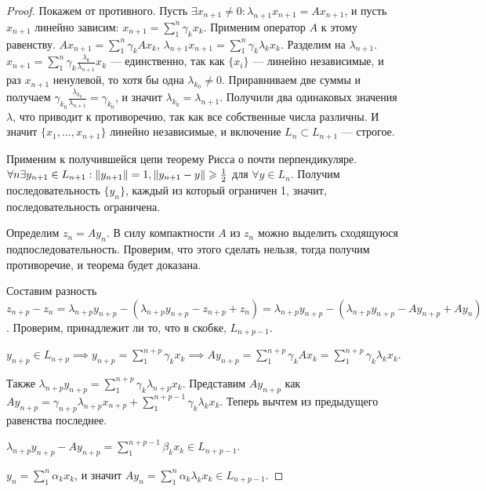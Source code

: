 \documentclass{article}
\begin{document}
\begin{proof}
    Покажем от противного. Пусть $\exists x_{n+1} \neq 0: \lambda_{n+1}x_{n+1} = A x_{n+1}$, и пусть $x_{n+1}$ линейно зависим: $x_{n+1} = \sum_{1}^{n}\gamma_k x_k$. Применим оператор $A$ к этому равенству. $A x_{n+1} = \sum_{1}^{n}\gamma_k A x_k$, $\lambda_{n+1} x_{n+1} = \sum_{1}^{n}\gamma_k \lambda_k x_k$. Разделим на $\lambda_{n+1}$. $x_{n+1} = \sum_{1}^{n}\gamma_k \frac{\lambda_k}{\lambda_{n+1}} x_k$ --- единственно, так как $\{x_{i}\}$ --- линейно независимые, и раз $x_{n+1}$ ненулевой, то хотя бы одна $\lambda_{k_{0}} \neq 0$. Приравниваем две суммы и получаем $\gamma_{k_{0}} \frac{\lambda_{k_{0}}}{\lambda_{n+1}} = \gamma_{k_{0}}$, и значит $\lambda_{k_{0}} = \lambda_{n+1}$. Получили два одинаковых значения $\lambda$, что приводит к противоречию, так как все собственные числа различны. И значит $\{x_{1}, \dotso, x_{n+1}\}$ линейно независимые, и включение $L_{n} \subset L_{n+1}$ --- строгое. \hfill \break

    Применим к получившейся цепи теорему Рисса о почти перпендикуляре. $\forall n \exists y_{n+1} \in L_{n+1}: \left\|y_{n+1}\right\| = 1, \left\|y_{n+1} - y\right\| \geqslant \frac{1}{2}$ для $\forall y \in L_n$. Получим последовательность $\{y_{n}\}$, каждый из который ограничен 1, значит, последовательность ограничена.
    
    Определим $z_{n} = Ay_n$. В силу компактности $A$ из $z_n$ можно выделить сходящуюся подпоследовательность. Проверим, что этого сделать нельзя, тогда получим противоречие, и теорема будет доказана.
    
    Составим разность $z_{n+p} - z_{n} = \lambda_{n+p}y_{n+p} - (\lambda_{n+p}y_{n+p} - z_{n+p} + z_{n}) = \lambda_{n+p}y_{n+p} - (\lambda_{n+p}y_{n+p} - Ay_{n+p} + Ay_{n})$. Проверим, принадлежит ли то, что в скобке, $L_{n+p-1}$. 
    
    $y_{n+p} \in L_{n+p} \implies y_{n+p} = \sum_{1}^{n+p}\gamma_k x_k \implies Ay_{n+p} = \sum_{1}^{n+p}\gamma_k Ax_k = \sum_{1}^{n+p}\gamma_k \lambda_k x_k$. 
    
    Также $\lambda_{n+p} y_{n+p} = \sum_{1}^{n+p}\gamma_k \lambda_{n+p}x_k$. Представим $Ay_{n+p}$ как $Ay_{n+p} = \gamma_{n+p}\lambda_{n+p}x_{n+p} + \sum_{1}^{n+p-1}\gamma_k \lambda_k x_k$. Теперь вычтем из предыдущего равенства последнее.
    
    $\lambda_{n+p} y_{n+p} - Ay_{n+p} = \sum_{1}^{n+p-1} \beta_k x_k \in L_{n+p-1}$.
    
    $y_{n} = \sum_{1}^{n} \alpha_k x_k$, и значит $Ay_{n} = \sum_{1}^{n} \alpha_k \lambda_k x_k \in L_{n+p-1}$.
    

\end{proof}
\end{document}
